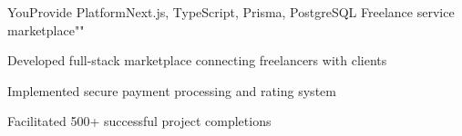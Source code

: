 \resumeSubheading
  {YouProvide Platform}{Next.js, TypeScript, Prisma, PostgreSQL}
  {Freelance service marketplace}{""}
  \vspace{\experienceItemSpacing}
  \resumeItemListStart
\item Developed full-stack marketplace connecting freelancers with clients
\item Implemented secure payment processing and rating system
\item Facilitated 500+ successful project completions
  \resumeItemListEnd